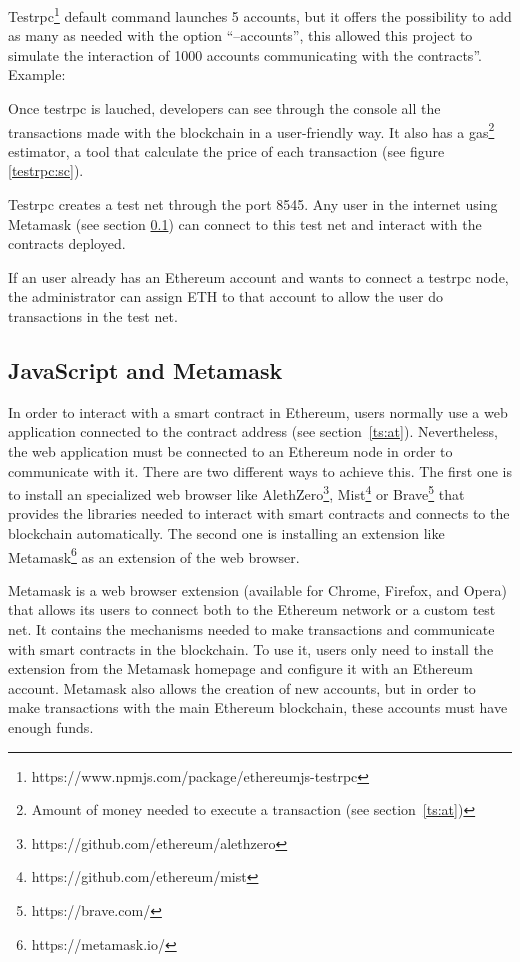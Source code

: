 \begin{itemize}
  Testrpc\footnote{https://www.npmjs.com/package/ethereumjs-testrpc} default
  command launches 5 accounts, but it offers the possibility to add as many as
  needed with the option ``--accounts'', this allowed this project to simulate
  the interaction of 1000 accounts communicating with the contracts''. Example:

   Once testrpc is lauched, developers can see through
  the console all the transactions made with the blockchain in a user-friendly
  way. It also has a gas\footnote{Amount of money needed to execute a
    transaction (see section~\ref{ts:at})} estimator, a tool that calculate the
  price of each transaction (see figure \ref{testrpc:sc}).

   Testrpc creates a test net through the port 8545. Any
  user in the internet using Metamask (see section \ref{jsmm}) can connect to
  this test net and interact with the contracts deployed.

   If an user already has an Ethereum
  account and wants to connect a testrpc node, the administrator can assign ETH
  to that account to allow the user do transactions in the test net.
\end{itemize}

\subsection{JavaScript and Metamask}
\label{jsmm}

In order to interact with a smart contract in Ethereum, users normally use a web
application connected to the contract address (see section~\ref{ts:at}).
Nevertheless, the web application must be connected to an Ethereum node in order
to communicate with it. There are two different ways to achieve this. The first
one is to install an specialized web browser like
AlethZero\footnote{https://github.com/ethereum/alethzero},
Mist\footnote{https://github.com/ethereum/mist} or
Brave\footnote{https://brave.com/} that provides the libraries needed to
interact with smart contracts and connects to the blockchain automatically. The
second one is installing an extension like
Metamask\footnote{https://metamask.io/} as an extension of the web browser.


Metamask is a web browser extension (available for Chrome, Firefox, and Opera)
that allows its users to connect both to the Ethereum network or a custom test
net. It contains the mechanisms needed to make transactions and communicate with
smart contracts in the blockchain. To use it, users only need to install the
extension from the Metamask homepage and configure it with an Ethereum account.
Metamask also allows the creation of new accounts, but in order to make
transactions with the main Ethereum blockchain, these accounts must have enough
funds.


